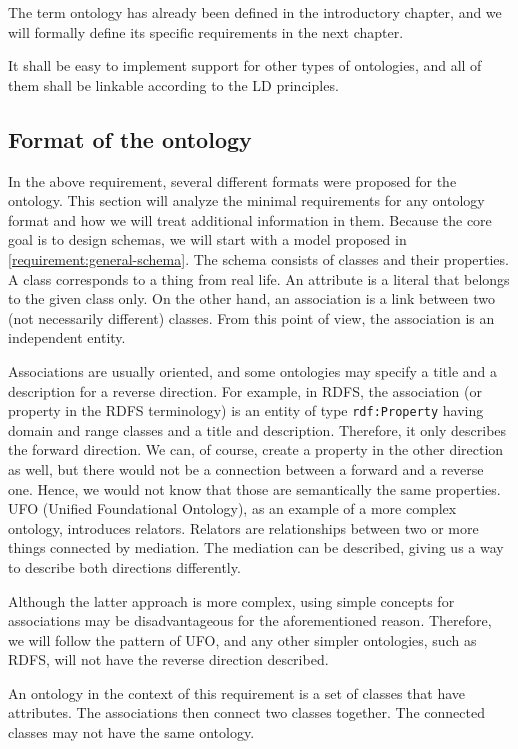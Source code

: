 The term ontology has already been defined in the introductory chapter, and we will formally define its specific requirements in the next chapter.

It shall be easy to implement support for other types of ontologies, and all of them shall be linkable according to the LD principles.

\subsection{Format of the ontology}

In the above requirement, several different formats were proposed for the ontology. This section will analyze the minimal requirements for any ontology format and how we will treat additional information in them. Because the core goal is to design schemas, we will start with a model proposed in \autoref{requirement:general-schema}. The schema consists of classes and their properties. A class corresponds to a thing from real life. An attribute is a literal that belongs to the given class only. On the other hand, an association is a link between two (not necessarily different) classes. From this point of view, the association is an independent entity.

Associations are usually oriented, and some ontologies may specify a title and a description for a reverse direction. For example, in RDFS, the association (or property in the RDFS terminology) is an entity of type {\tt rdf:Property} having domain and range classes and a title and description. Therefore, it only describes the forward direction. We can, of course, create a property in the other direction as well, but there would not be a connection between a forward and a reverse one. Hence, we would not know that those are semantically the same properties. UFO (Unified Foundational Ontology), as an example of a more complex ontology, introduces relators. Relators are relationships between two or more things connected by mediation. The mediation can be described, giving us a way to describe both directions differently.

Although the latter approach is more complex, using simple concepts for associations may be disadvantageous for the aforementioned reason. Therefore, we will follow the pattern of UFO, and any other simpler ontologies, such as RDFS, will not have the reverse direction described.

\medskip

An ontology in the context of this requirement is a set of classes that have attributes. The associations then connect two classes together. The connected classes may not have the same ontology.

